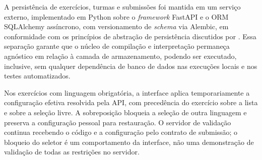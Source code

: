 A persistência de exercícios, turmas e submissões foi mantida em um serviço externo, implementado em Python sobre o \textit{framework} FastAPI e o ORM SQLAlchemy assíncrono, com versionamento de \textit{schema} via Alembic, em conformidade com os princípios de abstração de persistência discutidos por . Essa separação garante que o núcleo de compilação e interpretação permaneça agnóstico em relação à camada de armazenamento, podendo ser executado, inclusive, sem qualquer dependência de banco de dados nas execuções locais e nos testes automatizados.

Nos exercícios com linguagem obrigatória, a interface aplica temporariamente a configuração efetiva resolvida pela API, com precedência do exercício sobre a lista e sobre a seleção livre. A sobreposição bloqueia a seleção de outra linguagem e preserva a configuração pessoal para restauração. O servidor de validação continua recebendo o código e a configuração pelo contrato de submissão; o bloqueio do seletor é um comportamento da interface, não uma demonstração de validação de todas as restrições no servidor.


